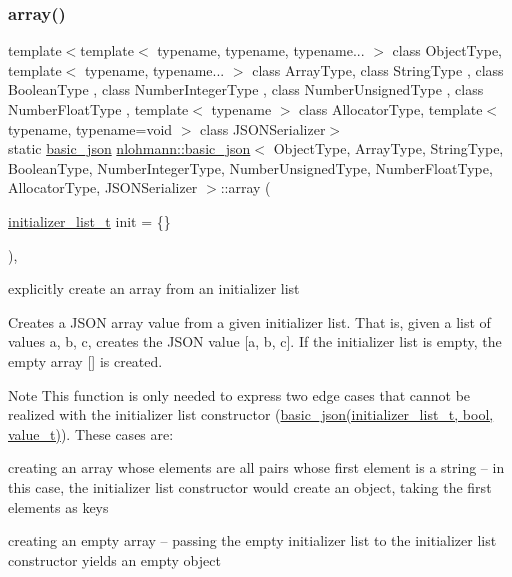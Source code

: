 \subsubsection{\texorpdfstring{array()}{array()}}
{\footnotesize\ttfamily template$<$template$<$ typename, typename, typename... $>$ class Object\+Type, template$<$ typename, typename... $>$ class Array\+Type, class String\+Type , class Boolean\+Type , class Number\+Integer\+Type , class Number\+Unsigned\+Type , class Number\+Float\+Type , template$<$ typename $>$ class Allocator\+Type, template$<$ typename, typename=void $>$ class J\+S\+O\+N\+Serializer$>$ \\
static \hyperlink{classnlohmann_1_1basic__json}{basic\+\_\+json} \hyperlink{classnlohmann_1_1basic__json}{nlohmann\+::basic\+\_\+json}$<$ Object\+Type, Array\+Type, String\+Type, Boolean\+Type, Number\+Integer\+Type, Number\+Unsigned\+Type, Number\+Float\+Type, Allocator\+Type, J\+S\+O\+N\+Serializer $>$\+::array (\begin{DoxyParamCaption}\item[{\hyperlink{classnlohmann_1_1basic__json_ad70a098fbc01c53497db29d3b5b656a9}{initializer\+\_\+list\+\_\+t}}]{init = {\ttfamily \{\}} }\end{DoxyParamCaption})\hspace{0.3cm}{\ttfamily [inline]}, {\ttfamily [static]}}



explicitly create an array from an initializer list 

Creates a J\+S\+ON array value from a given initializer list. That is, given a list of values {\ttfamily a, b, c}, creates the J\+S\+ON value {\ttfamily \mbox{[}a, b, c\mbox{]}}. If the initializer list is empty, the empty array {\ttfamily \mbox{[}\mbox{]}} is created.

\begin{DoxyNote}{Note}
This function is only needed to express two edge cases that cannot be realized with the initializer list constructor (\hyperlink{classnlohmann_1_1basic__json_ab5dfd9a2b2663b219641cb7fe59b6da2}{basic\+\_\+json(initializer\+\_\+list\+\_\+t, bool, value\+\_\+t)}). These cases are\+:
\begin{DoxyEnumerate}
\item creating an array whose elements are all pairs whose first element is a string -- in this case, the initializer list constructor would create an object, taking the first elements as keys
\item creating an empty array -- passing the empty initializer list to the initializer list constructor yields an empty object
\end{DoxyEnumerate}
\end{DoxyNote}

